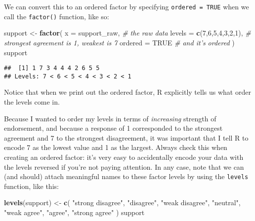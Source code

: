 \documentclass[]{book}
\newenvironment{Shaded}{\begin{snugshade}}{\end{snugshade}}
\newcommand{\CommentTok}[1]{\textcolor[rgb]{0.56,0.35,0.01}{\textit{#1}}}
\newcommand{\DataTypeTok}[1]{\textcolor[rgb]{0.13,0.29,0.53}{#1}}
\newcommand{\DecValTok}[1]{\textcolor[rgb]{0.00,0.00,0.81}{#1}}
\newcommand{\KeywordTok}[1]{\textcolor[rgb]{0.13,0.29,0.53}{\textbf{#1}}}
\newcommand{\NormalTok}[1]{#1}
\newcommand{\OtherTok}[1]{\textcolor[rgb]{0.56,0.35,0.01}{#1}}
\newcommand{\StringTok}[1]{\textcolor[rgb]{0.31,0.60,0.02}{#1}}
\begin{document}
We can convert this to an ordered factor by specifying \texttt{ordered\ =\ TRUE} when we call the \texttt{factor()} function, like so:

\begin{Shaded}
\begin{Highlighting}[]
\NormalTok{support <-}\StringTok{ }\KeywordTok{factor}\NormalTok{( }
  \DataTypeTok{x =}\NormalTok{ support_raw,            }\CommentTok{# the raw data}
  \DataTypeTok{levels =} \KeywordTok{c}\NormalTok{(}\DecValTok{7}\NormalTok{,}\DecValTok{6}\NormalTok{,}\DecValTok{5}\NormalTok{,}\DecValTok{4}\NormalTok{,}\DecValTok{3}\NormalTok{,}\DecValTok{2}\NormalTok{,}\DecValTok{1}\NormalTok{),  }\CommentTok{# strongest agreement is 1, weakest is 7}
  \DataTypeTok{ordered =} \OtherTok{TRUE}              \CommentTok{# and it’s ordered}
\NormalTok{)}
\NormalTok{support}
\end{Highlighting}
\end{Shaded}

\begin{verbatim}
##  [1] 1 7 3 4 4 4 2 6 5 5
## Levels: 7 < 6 < 5 < 4 < 3 < 2 < 1
\end{verbatim}

Notice that when we print out the ordered factor, R explicitly tells us what order the levels come in.

Because I wanted to order my levels in terms of \emph{increasing} strength of endorsement, and because a response of 1 corresponded to the strongest agreement and 7 to the strongest disagreement, it was important that I tell R to encode 7 as the lowest value and 1 as the largest. Always check this when creating an ordered factor: it's very easy to accidentally encode your data with the levels reversed if you're not paying attention. In any case, note that we can (and should) attach meaningful names to these factor levels by using the \texttt{levels} function, like this:

\begin{Shaded}
\begin{Highlighting}[]
\KeywordTok{levels}\NormalTok{(support) <-}\StringTok{ }\KeywordTok{c}\NormalTok{( }
  \StringTok{"strong disagree"}\NormalTok{, }\StringTok{"disagree"}\NormalTok{, }\StringTok{"weak disagree"}\NormalTok{,}
  \StringTok{"neutral"}\NormalTok{, }\StringTok{"weak agree"}\NormalTok{, }\StringTok{"agree"}\NormalTok{, }\StringTok{"strong agree"} 
\NormalTok{)}
\NormalTok{support}
\end{Highlighting}
\end{Shaded}
\end{document}
